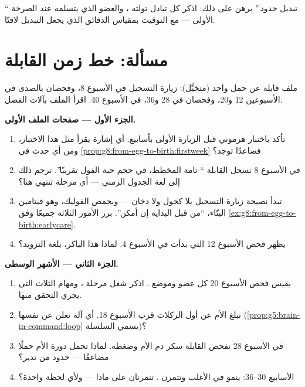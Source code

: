 \begin{exercise}[$\star\star\star$]\label{exo:g8:from-egg-to-birth:12}
`` تبديل حدود.'' برهن على ذلك: اذكر كل تبادل
تولته ، والعضو الذي يتسلمه عند الصرخة الأولى ---
مع التوقيت بمقياس الدقائق الذي يجعل التبديل لافتًا.
\end{exercise}

\section{مسألة: خط زمن القابلة}

\begin{problem}\label{pb:g8:from-egg-to-birth:1}
ملف قابلة عن حمل واحد (متخيَّل): زيارة التسجيل في
الأسبوع 8، وفحصان بالصدى في الأسبوعين 12 و20، وفحصان في
28 و36،  في الأسبوع 40. اقرأ الملف بآلات
الفصل.

\medskip\noindent\textbf{الجزء الأول --- صفحات الملف
الأولى.}
\begin{enumerate}
  \item تأكد  باختبار هرموني قبل الزيارة الأولى
        بأسابيع. أي إشارة يقرأ مثل هذا الاختبار، ومن أي
        حدث في \cref{prop:g8:from-egg-to-birth:firstweek}
        فصاعدًا توجد؟
  \item في الأسبوع 8 تسجل القابلة `` تامة المخطط،
        في حجم حبة الفول تقريبًا''. ترجم ذلك إلى لغة
        الجدول الزمني --- أي مرحلة تنتهي هنا؟
  \item تبدأ نصيحة زيارة التسجيل بلا كحول ولا دخان ---
        وبحمض الفوليك، وهو فيتامين البنّاء، ``من قبل
        البداية إن أمكن''. برر الأمور الثلاثة جميعًا وفق
        \cref{ex:g8:from-egg-to-birth:earlycare}.
  \item يظهر فحص الأسبوع 12  التي بدأت في
        الأسبوع 4. لماذا هذا الباكر، بلغة التزويد؟
\end{enumerate}

\medskip\noindent\textbf{الجزء الثاني --- الأشهر الوسطى.}
\begin{enumerate}[resume]
  \item يقيس فحص الأسبوع 20 كل عضو وموضع . اذكر
        شغل مرحلة ، ومهام  الثلاث التي يجري
        التحقق منها.
  \item تبلغ الأم عن أول الركلات قرب الأسبوع 18. أي آلة
        تعلن عن نفسها (\cref{prop:g5:brain-in-command:loop}
        يسمي السلسلة)؟
  \item في الأسبوع 28 تفحص القابلة سكر دم الأم وضغطه.
        لماذا تحمل دورة الأم حملًا مضاعفًا --- حدود من
        تدير؟
  \item الأسابيع 30--36: ينمو  في الأغلب وتتمرن
        . تتمرنان على ماذا --- ولأي لحظة واحدة؟
\end{enumerate}


\end{problem}

